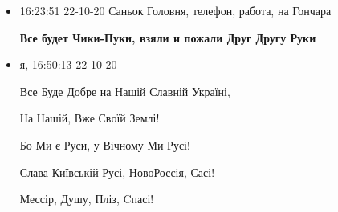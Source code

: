  

\begin{itemize}
\item 16:23:51 22-10-20 Саньок Головня, телефон, работа, на Гончара

\textbf{Все будет Чики-Пуки, взяли и пожали Друг Другу Руки}

\item я, 16:50:13 22-10-20

Все Буде Добре на Нашій Славній Україні, 

На Нашій, Вже Своїй Землі!

Бо Ми є Руси, у Вічному Ми Русі! 

Слава Київській Русі, НовоРоссія, Сасі!

Мессір, Душу, Пліз, Cпасі!

\end{itemize}
 
